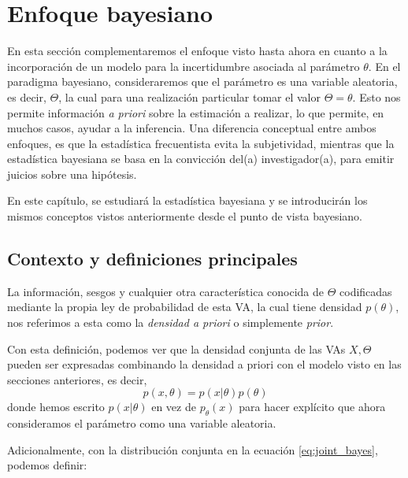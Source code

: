 
\chapter{Enfoque bayesiano}

En esta sección complementaremos el enfoque visto hasta ahora en cuanto a la incorporación de un modelo para la incertidumbre asociada al parámetro $\theta$. En el paradigma bayesiano, consideraremos que el parámetro es una variable aleatoria, es decir, $\Theta$, la cual para una realización particular tomar el valor $\Theta = \theta$. Esto nos permite información \emph{a priori} sobre la estimación a realizar, lo que permite, en muchos casos, ayudar a la inferencia. Una diferencia conceptual entre ambos enfoques, es que la estadística frecuentista evita la subjetividad, mientras que la estadística bayesiana se basa en la convicción del(a) investigador(a), para emitir juicios sobre una hipótesis.

En este capítulo, se estudiará la estadística bayesiana y se introducirán los mismos conceptos vistos anteriormente desde el punto de vista bayesiano.




\section{Contexto y definiciones principales}

\begin{definition}
La información, sesgos y cualquier otra característica conocida de $\Theta$ codificadas mediante la propia ley de probabilidad de esta VA, la cual tiene densidad $p(\theta)$, nos referimos a esta como la \emph{densidad a priori} o simplemente \emph{prior}.
\end{definition}

Con esta definición, podemos ver que la densidad conjunta de las VAs $X,\Theta$ pueden ser expresadas combinando la densidad a priori con el modelo visto en las secciones anteriores, es decir, 
\begin{equation}
    p(x,\theta) = p(x|\theta)p(\theta)
    \label{eq:joint_bayes}
\end{equation}
donde hemos escrito $p(x|\theta)$ en vez de $p_\theta(x)$ para hacer explícito que ahora consideramos el parámetro como una variable aleatoria. 

Adicionalmente, con la distribución conjunta en la ecuación \eqref{eq:joint_bayes}, podemos definir:

